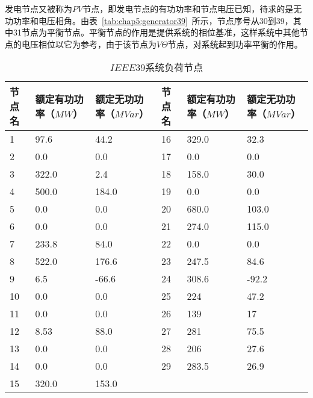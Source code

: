 发电节点又被称为$PV$节点，即发电节点的有功功率和节点电压已知，待求的是无功功率和电压相角。由表~\ref{tab:chap5:generator39}~所示，节点序号从30到39，其中31节点为平衡节点。平衡节点的作用是提供系统的相位基准，这样系统中其他节点的电压相位以它为参考，由于该节点为$V\Theta$节点，对系统起到功率平衡的作用。
\begin{table}[H]
   \centering
   \caption{$IEEE$39系统负荷节点}
   \label{tab:chap5:load39}
     \begin{tabular}{C{1.2cm}C{2.4cm}C{2.4cm}C{1.2cm}C{2.4cm}C{2.4cm}}
\toprule
             \textbf{节点名}        &\textbf{额定有功功率（$MW$）}      &\textbf{额定无功功率（$MVar$）}   & \textbf{节点名}        &\textbf{额定有功功率（$MW$）}      &\textbf{额定无功功率（$MVar$）}       \\
        &97.6 &44.2 & 16        &329.0 &32.3\\
             2        &0.0 &0.0 &17        &0.0 &0.0\\
             3        &322.0  &2.4 &18        &158.0 &30.0\\
             4        &500.0  &184.0 &19        &0.0 &0.0\\
             5        &0.0 &0.0 &20        &680.0 &103.0\\
             6       &0.0 &0.0 &21        &274.0 &115.0\\
             7        &233.8 &84.0 &22        &0.0 &0.0\\
             8        &522.0 &176.6 &23        &247.5 &84.6\\
             9        &6.5 &-66.6 &24        &308.6 &-92.2\\
             10        &0.0 &0.0 &25        &224 &47.2\\
             11        &0.0 &0.0 &26        &139 &17\\
             12        &8.53 &88.0 &27        &281 &75.5\\
             13        &0.0 &0.0 &28        &206 &27.6\\
             14        &0.0 &0.0 &29        &283.5 &26.9\\
             15        &320.0 &153.0 & & &\\
\bottomrule
\end{tabular}
\end{table}

